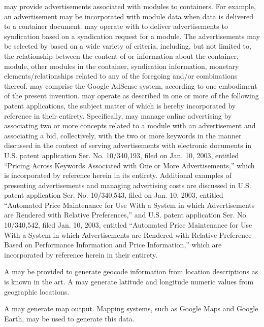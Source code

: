 \Adserver{} may
provide advertisements associated with modules to containers. For
example, an advertisement may be incorporated with module data when
data is delivered to a container document. \Adserver{} may
operate with \syndicationserver{} to deliver advertisements to
syndication \recipientservers{} based on a syndication request
for a module. The advertisements may be selected by \adserver{} based on a wide variety of criteria, including, but not
limited to, the relationship between the content of or information
about the container, module, other modules in the container,
syndication \recipientserver{} information, monetary
elements/relationships related to any of the foregoing and/or
combinations thereof. \Adserver{} may comprise the Google
AdSense system, according to one embodiment of the present
invention. \Adserver{} may operate as described in one or more
of the following patent applications, the subject matter of which is
hereby incorporated by reference in their entirety. Specifically, \adserver{} may manage online advertising by associating two or
more concepts related to a module with an advertisement and
associating a bid, collectively, with the two or more keywords in the
manner discussed in the context of serving advertisements with
electronic documents in U.S. patent application Ser. No. 10/340,193,
filed on Jan. 10, 2003, entitled ``Pricing Across Keywords
Associated with One or More Advertisements,'' which is
incorporated by reference herein in its entirety. Additional examples
of presenting advertisements and managing advertising costs are
discussed in U.S. patent application Ser. No. 10/340,543, filed on
Jan. 10, 2003, entitled ``Automated Price Maintenance for Use
With a System in which Advertisements are Rendered with Relative
Preferences,'' and U.S. patent application Ser. No. 10/340,542,
filed Jan. 10, 2003, entitled ``Automated Price Maintenance for
Use With a System in which Advertisements are Rendered with Relative
Preference Based on Performance Information and Price
Information,'' which are incorporated by reference herein in
their entirety.



A \geocodeserver{}
may be provided to generate geocode information from location
descriptions as is known in the art. A \geocodeserver{} may
generate latitude and longitude numeric values from geographic
locations.



A \mapserver{} may
generate map output. Mapping systems, such as Google Maps and Google
Earth, may be used to generate this data.



